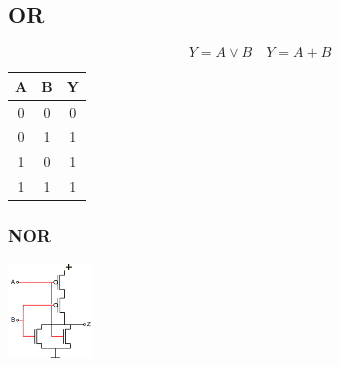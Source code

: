 \subsection{OR}
\begin{center}
    \begin{minipage}{0.55\linewidth}
        \begin{equation*}
            Y = A \lor B \quad Y = A + B
        \end{equation*}
        \begin{center}
        \end{center}
    \end{minipage}
    \hfill
    \begin{minipage}{0.35\linewidth}
        \begin{tabular}{|c c|c|}
            \hline
            A & B & Y\\
            \hline
            0 & 0 & 0\\
            0 & 1 & 1\\
            1 & 0 & 1\\
            1 & 1 & 1\\
            \hline
        \end{tabular}
    \end{minipage}
    \begin{minipage}[t]{0.45\linewidth}
        \subsubsection{NOR}
        \includegraphics[height = 25mm]{images/nor.png}
    \end{minipage}
    \begin{minipage}[t]{0.45\linewidth}

\end{minipage}
\end{center}
